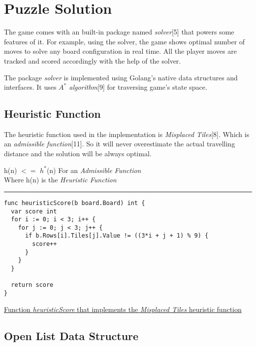 \documentclass[a4paper]{article}
\begin{document}

\section{Puzzle Solution}

\textrm{\normalsize{The game comes with an built-in package named \textit{solver}[5] that powers some features of it. For
example, using the solver, the game shows optimal number of moves to solve any board
configuration in real time. All the player moves are tracked and scored accordingly with the help of
the solver.\\}}

\textrm{\normalsize{The package \textit{solver} is implemented using Golang's native data structures and interfaces. It uses
\textit{$A^{*}$ algorithm}[9] for traversing game's state space.\\}}

\subsection{Heuristic Function}

\textrm{\normalsize{The heuristic function used in the implementation is \textit{Misplaced Tiles}[8]. Which is an \textit{admissible
function}[11]. So it will never overestimate the actual travelling distance and the solution will be always optimal.\\}}

\begin{center}
h(n) $<=$ $h^{*}$(n) For an \textit{Admissible Function}\\
Where h(n) is the \textit{Heuristic Function} 
\end{center}

\rule{\textwidth}{1pt}
\begin{verbatim}
func heuristicScore(b board.Board) int {
  var score int
  for i := 0; i < 3; i++ {
    for j := 0; j < 3; j++ {
      if b.Rows[i].Tiles[j].Value != ((3*i + j + 1) % 9) {
        score++
      }
    }
  }

  return score
}
\end{verbatim}
\underline{Function \textit{heuristicScore} that implements the \textit{Misplaced Tiles} heuristic function\\}

\subsection{Open List Data Structure}
\end{document}
